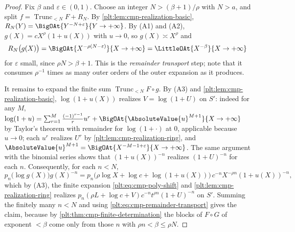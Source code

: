 \documentclass[11pt,oneside]{article}
\theoremstyle{plain}
\theoremstyle{definition}
\theoremstyle{remark}
\newcommand{\Trunc}[2]{\operatorname{Trunc}_{<#2}#1}     %
\newcommand{\compose}{\mathbin{\circ}}
\begin{document}
\begin{proof}
Fix \(\beta\) and \(\varepsilon\in(0,1)\).  Choose an integer
\(N>(\beta+1)/\rho\) with \(N>a\), and split
\(f=\Trunc{F}{N}+R_{N}\).  By \cref{plt:lem:cmp-realization-basic},
\(R_{N}(Y)=\BigOAt{Y^{-N+\varepsilon}}{Y\to+\infty}\).  By (A1) and (A2),
\(g(X)=cX^{\rho}(1+u(X))\) with \(u\to0\), so \(g(X)\asymp X^{\rho}\) and
\begin{equation}\label{plt:eq:cmp-remainder-transport}
 R_{N}\bigl(g(X)\bigr)
 =\BigOAt{X^{-\rho(N-\varepsilon)}}{X\to+\infty}
 =\LittleOAt{X^{-\beta}}{X\to+\infty}
\end{equation}
for \(\varepsilon\) small, since \(\rho N>\beta+1\).  This is the
\emph{remainder transport} step; note that it consumes \(\rho^{-1}\) times as
many outer orders of the outer expansion as it produces.

It remains to expand the finite sum \(\Trunc{F}{N}\circ g\).  By (A3) and
\cref{plt:lem:cmp-realization-basic}, \(\log(1+u(X))\) realizes
\(V=\log(1+U)\) on \(S'\): indeed for any \(M\),
\(\log(1+u)=\sum_{r=1}^{M}\frac{(-1)^{r-1}}{r}u^{r}
 +\BigOAt{\AbsoluteValue{u}^{M+1}}{X\to+\infty}\)
by Taylor's theorem with remainder for \(\log(1+\cdot)\) at \(0\), applicable
because \(u\to0\); each \(u^{r}\) realizes \(U^{r}\) by
\cref{plt:lem:cmp-realization-ring}, and
\(\AbsoluteValue{u}^{M+1}=\BigOAt{X^{-M-1+\varepsilon}}{X\to+\infty}\).
The same argument with the binomial series shows that
\((1+u(X))^{-n}\) realizes \((1+U)^{-n}\) for each \(n\).  Consequently, for
each \(n<N\),
\[
 p_n\bigl(\log g(X)\bigr)g(X)^{-n}
 =p_n\bigl(\rho\log X+\log c+\log(1+u(X))\bigr)\,
   c^{-n}X^{-\rho n}(1+u(X))^{-n},
\]
which by (A3), the finite expansion \eqref{plt:eq:cmp-poly-shift} and
\cref{plt:lem:cmp-realization-ring} realizes
\(p_n(\rho L+\log c+V)c^{-n}t^{\rho n}(1+U)^{-n}\) on \(S'\).  Summing the
finitely many \(n<N\) and using
\eqref{plt:eq:cmp-remainder-transport} gives the claim, because by
\cref{plt:thm:cmp-finite-determination} the blocks of \(F\compose G\) of
exponent \(<\beta\) come only from those \(n\) with \(\rho n<\beta\le\rho N\).
\end{proof}
\end{document}
